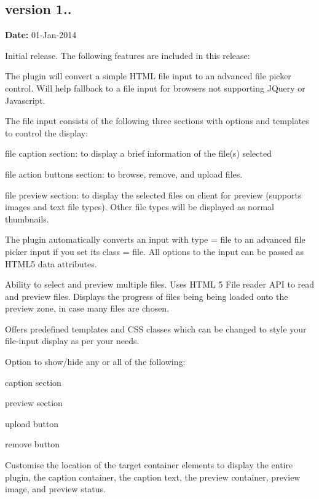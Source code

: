 \subsection*{version 1..}

{\bfseries Date\+:} 01-\/\+Jan-\/2014

Initial release. The following features are included in this release\+:


\begin{DoxyItemize}
\item The plugin will convert a simple H\+T\+ML file input to an advanced file picker control. Will help fallback to a file input for browsers not supporting J\+Query or Javascript.
\item The file input consists of the following three sections with options and templates to control the display\+:
\begin{DoxyItemize}
\item file caption section\+: to display a brief information of the file(s) selected
\item file action buttons section\+: to browse, remove, and upload files.
\item file preview section\+: to display the selected files on client for preview (supports images and text file types). Other file types will be displayed as normal thumbnails.
\end{DoxyItemize}
\item The plugin automatically converts an input with {\ttfamily type = file} to an advanced file picker input if you set its {\ttfamily class = file}. All options to the input can be passed as H\+T\+M\+L5 {\ttfamily data} attributes.
\item Ability to select and preview multiple files. Uses H\+T\+ML 5 File reader A\+PI to read and preview files. Displays the progress of files being being loaded onto the preview zone, in case many files are chosen.
\item Offers predefined templates and C\+SS classes which can be changed to style your file-\/input display as per your needs.
\item Option to show/hide any or all of the following\+:
\begin{DoxyItemize}
\item caption section
\item preview section
\item upload button
\item remove button
\end{DoxyItemize}
\item Customise the location of the target container elements to display the entire plugin, the caption container, the caption text, the preview container, preview image, and preview status.

\end{DoxyItemize}
